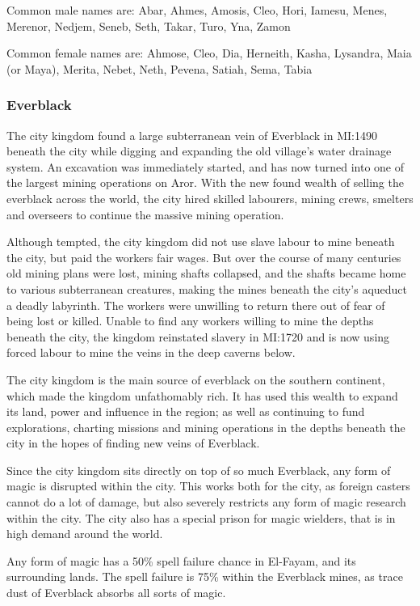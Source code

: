 Common male names are: Abar, Ahmes, Amosis, Cleo, Hori, Iamesu, Menes,
Merenor, Nedjem, Seneb, Seth, Takar, Turo, Yna, Zamon

Common female names are: Ahmose, Cleo, Dia, Herneith, Kasha, Lysandra, Maia
(or Maya), Merita, Nebet, Neth, Pevena, Satiah, Sema, Tabia

\subsubsection{Everblack}

The city kingdom found a large subterranean vein of Everblack in MI:1490
beneath the city while digging and expanding the old village's water drainage
system. An excavation was immediately started, and has now turned into one of
the largest mining operations on Aror. With the new found wealth of selling
the everblack across the world, the city hired skilled labourers, mining
crews, smelters and overseers to continue the massive mining operation.

Although tempted, the city kingdom did not use slave labour to mine beneath
the city, but paid the workers fair wages. But over the course of many
centuries old mining plans were lost, mining shafts collapsed, and the shafts
became home to various subterranean creatures, making the mines beneath the
city's aqueduct a deadly labyrinth. The workers were unwilling to return
there out of fear of being lost or killed. Unable to find any workers willing
to mine the depths beneath the city, the kingdom reinstated slavery in MI:1720
and is now using forced labour to mine the veins in the deep caverns below.

The city kingdom is the main source of everblack on the southern continent,
which made the kingdom unfathomably rich. It has used this wealth to expand
its land, power and influence in the region; as well as continuing to fund
explorations, charting missions and mining operations in the depths beneath
the city in the hopes of finding new veins of Everblack.

Since the city kingdom sits directly on top of so much Everblack, any form
of magic is disrupted within the city. This works both for the city, as
foreign casters cannot do a lot of damage, but also severely restricts any
form of magic research within the city. The city also has a special prison
for magic wielders, that is in high demand around the world.

\begin{note}
  Any form of magic has a 50\% spell failure chance in El-Fayam, and its
  surrounding lands. The spell failure is 75\% within the Everblack mines,
  as trace dust of Everblack absorbs all sorts of magic.
\end{note}

